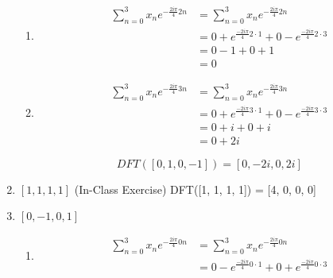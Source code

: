\documentclass{article}
\begin{document}
\begin{enumerate}[label=\Alph*)]
\begin{enumerate}[label={k=\arabic*}, start=0]
              \item \begin{align*}
                        \sum_{n=0}^{3}{x_n e^{-\frac{2 i \pi}{4}2n}} & = \sum_{n=0}^{3}{x_n e^{-\frac{2 i \pi}{4}2n}}                                \\
                                                                     & = 0 + e^{\frac{-2 i \pi}{4} 2 \cdot 1} + 0 - e^{\frac{-2 i \pi}{4} 2 \cdot 3} \\
                                                                     & = 0 - 1 + 0 + 1                                                               \\
                                                                     & = 0
                    \end{align*}
              \item \begin{align*}
                        \sum_{n=0}^{3}{x_n e^{-\frac{2 i \pi}{4}3n}} & = \sum_{n=0}^{3}{x_n e^{-\frac{2 i \pi}{4}3n}}                                \\
                                                                     & = 0 + e^{\frac{-2 i \pi}{4} 3 \cdot 1} + 0 - e^{\frac{-2 i \pi}{4} 3 \cdot 3} \\
                                                                     & = 0 + i + 0 + i                                                               \\
                                                                     & = 0 + 2i
                    \end{align*}
          \end{enumerate}
          \begin{equation*}
              DFT([0, 1, 0, -1]) = [0, -2i, 0, 2i]
          \end{equation*}
    \item \pagebreak \([1, 1, 1, 1]\)
          (In-Class Exercise)
          DFT([1, 1, 1, 1]) = [4, 0, 0, 0]
    \item \([0, -1, 0, 1]\)
          \begin{enumerate}[label={k=\arabic*}, start=0]
              \item \begin{align*}
                        \sum_{n=0}^{3}{x_n e^{-\frac{2 i \pi}{4}0n}} & = \sum_{n=0}^{3}{x_n e^{-\frac{2 i \pi}{4}0n}}                                \\
                                                                     & = 0 - e^{\frac{-2 i \pi}{4} 0 \cdot 1} + 0 + e^{\frac{-2 i \pi}{4} 0 \cdot 3} \\

\end{align*}
\end{enumerate}
\end{enumerate}
\end{document}
